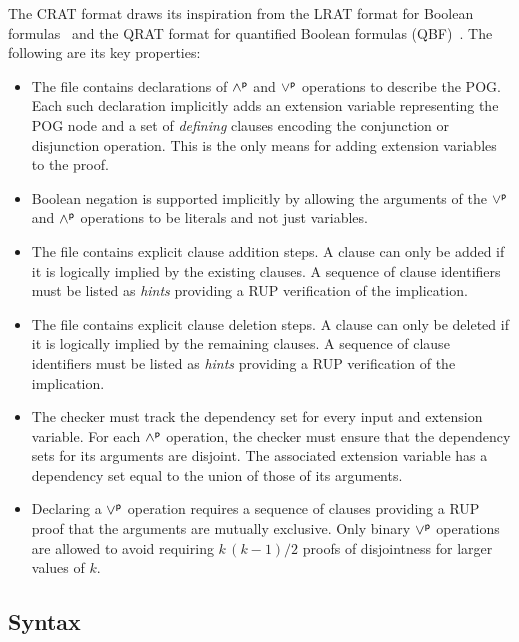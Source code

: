 \documentclass[letterpaper,USenglish,cleveref, autoref, thm-restate]{lipics-v2021}
\newcommand{\pand}{\mathbin{\land^{\sf p}}}
\newcommand{\por}{\mathbin{\lor^{\sf p}}}
\begin{document}
The CRAT format draws its inspiration from the LRAT format for Boolean
formulas~\cite{lrat} and the QRAT format for quantified Boolean
formulas (QBF)~\cite{heule:JAR2014}.  The following are its key properties:
\begin{itemize}
  \item
  The file contains declarations of $\pand$ and $\por$ operations to describe the POG.
  Each such declaration implicitly adds an extension variable representing the POG node and a set of {\em defining} clauses
  encoding the conjunction or disjunction operation.
  This is the only means for adding extension variables to the proof.
\item Boolean negation is supported implicitly by allowing the
  arguments of the $\por$ and $\pand$ operations to be literals and not just
  variables.
\item
  The file contains explicit clause addition steps.
  A clause can only be added if it is logically implied by the existing clauses.
  A sequence of clause identifiers must be listed as {\em hints} providing a RUP verification of the implication.
\item
  The file contains explicit clause deletion steps.
  A clause can only be deleted if it is logically implied by the remaining clauses.
  A sequence of clause identifiers must be listed as {\em hints} providing a RUP verification of the implication.
\item The checker must track the dependency set for every input and
  extension variable.  For each $\pand$ operation, the checker must ensure that the dependency sets for its arguments are disjoint.
  The associated extension variable has a dependency set equal to the union of those of its arguments.
\item Declaring a $\por$ operation requires a sequence of clauses
  providing a RUP proof that the arguments are mutually exclusive.
  Only binary $\por$ operations are allowed to avoid requiring
  $k\,(k-1)/2$ proofs of disjointness for larger values of $k$.
\end{itemize}

\subsection{Syntax}
\end{document}

